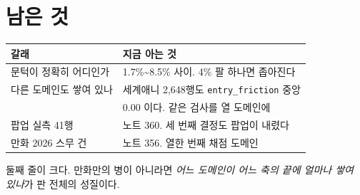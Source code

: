 \documentclass[11pt]{article}
\begin{document}
\section{남은 것}

\begin{center}
\begin{tabular}{ll}
\hline
갈래 & 지금 아는 것 \\
\hline
문턱이 정확히 어디인가 & 1.7\%\textasciitilde{}8.5\% 사이. 4\% 팔 하나면 좁아진다 \\
다른 도메인도 쌓여 있나 & 세계애니 2,648행도 \texttt{entry\_friction} 중앙 \\
 & 0.00 이다. 같은 검사를 열 도메인에 \\
팝업 실측 41행 & 노트 360. 세 번째 결정도 팝업이 내렸다 \\
만화 2026 스무 건 & 노트 356. 열한 번째 채점 도메인 \\
\hline
\end{tabular}
\end{center}

둘째 줄이 크다. 만화만의 병이 아니라면 \emph{어느 도메인이 어느 축의 끝에
얼마나 쌓여 있나}가 판 전체의 성질이다.
\end{document}
